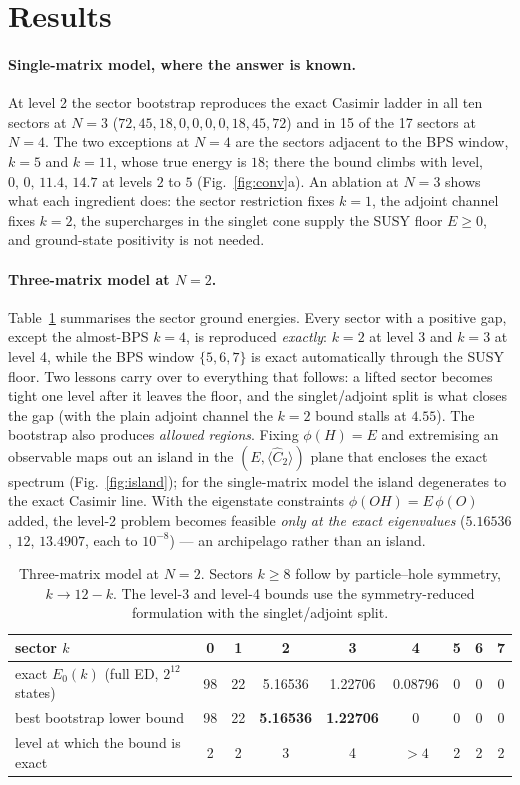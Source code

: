 \documentclass[10pt]{article}
\begin{document}
\section{Results}\label{sec:results}

\paragraph{Single-matrix model, where the answer is known.}
At level 2 the sector bootstrap reproduces the exact Casimir ladder in all ten sectors at $N=3$ ($72,45,18,0,0,0,0,18,45,72$) and in 15 of the 17 sectors at $N=4$. The two exceptions at $N=4$ are the sectors adjacent to the BPS window, $k=5$ and $k=11$, whose true energy is $18$; there the bound climbs with level, $0,\,0,\,11.4,\,14.7$ at levels $2$ to $5$ (Fig.~\ref{fig:conv}a). An ablation at $N=3$ shows what each ingredient does: the sector restriction fixes $k=1$, the adjoint channel fixes $k=2$, the supercharges in the singlet cone supply the SUSY floor $E\ge0$, and ground-state positivity is not needed.

\paragraph{Three-matrix model at $N=2$.}
Table~\ref{tab:N2} summarises the sector ground energies. Every sector with a positive gap, except the almost-BPS $k=4$, is reproduced \emph{exactly}: $k=2$ at level 3 and $k=3$ at level 4, while the BPS window $\{5,6,7\}$ is exact automatically through the SUSY floor. Two lessons carry over to everything that follows: a lifted sector becomes tight one level after it leaves the floor, and the singlet/adjoint split is what closes the gap (with the plain adjoint channel the $k=2$ bound stalls at $4.55$). The bootstrap also produces \emph{allowed regions}. Fixing $\phi(H)=E$ and extremising an observable maps out an island in the $(E,\langle\hat C_2\rangle)$ plane that encloses the exact spectrum (Fig.~\ref{fig:island}); for the single-matrix model the island degenerates to the exact Casimir line. With the eigenstate constraints $\phi(OH)=E\,\phi(O)$ added, the level-2 problem becomes feasible \emph{only at the exact eigenvalues} ($5.16536$, $12$, $13.4907$, each to $10^{-8}$) --- an archipelago rather than an island.

\begin{table}[tb]\centering\small
\begin{tabular}{@{}lcccccccc@{}}\toprule
sector $k$ & 0 & 1 & 2 & 3 & 4 & 5 & 6 & 7\\\midrule
exact $E_0(k)$ (full ED, $2^{12}$ states) & 98 & 22 & 5.16536 & 1.22706 & 0.08796 & 0 & 0 & 0\\
best bootstrap lower bound & 98 & 22 & \textbf{5.16536} & \textbf{1.22706} & 0 & 0 & 0 & 0\\
level at which the bound is exact & 2 & 2 & 3 & 4 & $>4$ & 2 & 2 & 2\\\bottomrule
\end{tabular}
\caption{Three-matrix model at $N=2$. Sectors $k\ge8$ follow by particle--hole symmetry, $k\to12-k$. The level-3 and level-4 bounds use the symmetry-reduced formulation with the singlet/adjoint split.}
\label{tab:N2}
\end{table}
\end{document}
